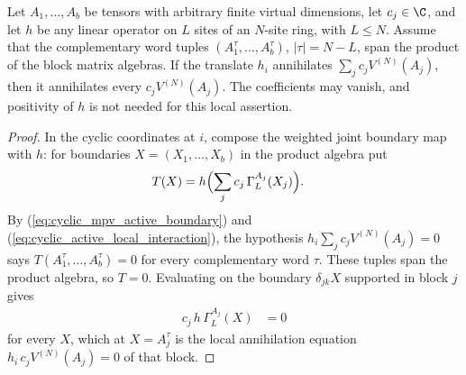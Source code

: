 \begin{lemma}
    \label{lem:arbitrary_local_block_separation}
    \leanok
    Let $A_1,\ldots,A_b$ be tensors with arbitrary finite virtual dimensions,
    let $c_j\in\C$, and let $h$ be any linear operator on $L$ sites of an
    $N$-site ring, with $L\le N$. Assume that the complementary word tuples
    $(A_1^\tau,\ldots,A_b^\tau)$, $|\tau|=N-L$, span the product of the
    block matrix algebras. If the translate $h_i$ annihilates
    $\sum_j c_jV^{(N)}(A_j)$, then it annihilates every
    $c_jV^{(N)}(A_j)$. The coefficients may vanish, and positivity of $h$
    is not needed for this local assertion.
\end{lemma}
\begin{proof}\leanok
    In the cyclic coordinates at $i$, compose the weighted joint boundary map
    with $h$: for boundaries $X=(X_1,\ldots,X_b)$ in the product algebra put
    \begin{align}
        T(X) & =h\Bigl(\sum_jc_j\,\Gamma_L^{A_j}(X_j)\Bigr).
        \label{eq:arbitrary_local_block_separation_map}
    \end{align}
    By (\ref{eq:cyclic_mpv_active_boundary}) and
    (\ref{eq:cyclic_active_local_interaction}), the hypothesis
    $h_i\sum_jc_jV^{(N)}(A_j)=0$ says $T(A_1^\tau,\ldots,A_b^\tau)=0$ for
    every complementary word $\tau$. These tuples span the product algebra, so
    $T=0$. Evaluating on the boundary $\delta_{jk}X$ supported in block $j$
    gives
    \begin{align}
        c_j\,h\,\Gamma_L^{A_j}(X) & =0
        \label{eq:arbitrary_local_block_separation_single}
    \end{align}
    for every $X$, which at $X=A_j^\tau$ is the local annihilation equation
    $h_i\,c_jV^{(N)}(A_j)=0$ of that block.
\end{proof}

